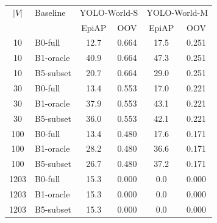 \begin{tabular}{c l cc cc}
\toprule
$|V|$ & Baseline & \multicolumn{2}{c}{YOLO-World-S} & \multicolumn{2}{c}{YOLO-World-M} \\
 &  & EpiAP & OOV & EpiAP & OOV \\
\midrule
10 & B0-full & 12.7 & 0.664 & 17.5 & 0.251 \\
10 & B1-oracle & 40.9 & 0.664 & 47.3 & 0.251 \\
10 & B5-subset & 20.7 & 0.664 & 29.0 & 0.251 \\
30 & B0-full & 13.4 & 0.553 & 17.0 & 0.221 \\
30 & B1-oracle & 37.9 & 0.553 & 43.1 & 0.221 \\
30 & B5-subset & 36.0 & 0.553 & 42.1 & 0.221 \\
100 & B0-full & 13.4 & 0.480 & 17.6 & 0.171 \\
100 & B1-oracle & 28.2 & 0.480 & 36.6 & 0.171 \\
100 & B5-subset & 26.7 & 0.480 & 37.2 & 0.171 \\
1203 & B0-full & 15.3 & 0.000 & 0.0 & 0.000 \\
1203 & B1-oracle & 15.3 & 0.000 & 0.0 & 0.000 \\
1203 & B5-subset & 15.3 & 0.000 & 0.0 & 0.000 \\
\bottomrule
\end{tabular}
